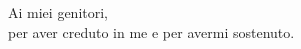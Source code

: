 \newpage\null\thispagestyle{empty}\newpage %
\thispagestyle{empty}
\newenvironment{dedication}
  {\clearpage           %
   \thispagestyle{empty}%
   \vspace*{\stretch{1}}%
   \itshape             %
   \raggedleft          %
  }
  {\par %
   \vspace{\stretch{3}} %
   \clearpage           %
  }

\begin{dedication}
Ai miei genitori, \\per aver creduto in me e per avermi sostenuto.
\end{dedication}